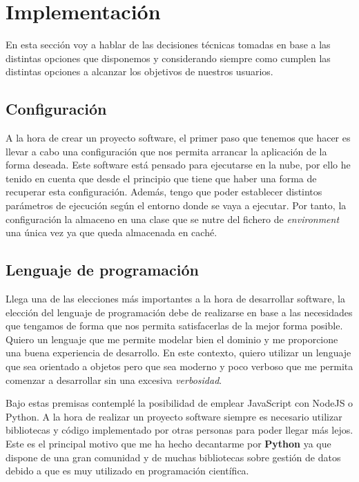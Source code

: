 \section{Implementación}
En esta sección voy a hablar de las decisiones técnicas tomadas en base a las distintas opciones que disponemos y considerando siempre como cumplen las distintas opciones a alcanzar los objetivos de nuestros usuarios.

\subsection{Configuración}
A la hora de crear un proyecto software, el primer paso que tenemos que hacer es llevar a cabo una configuración que nos permita arrancar la aplicación de la forma deseada. Este software está pensado para ejecutarse en la nube, por ello he tenido en cuenta que desde el principio que tiene que haber una forma de recuperar esta configuración. Además, tengo que poder establecer distintos parámetros de ejecución según el entorno donde se vaya a ejecutar. Por tanto, la configuración la almaceno en una clase que se nutre del fichero de \textit{environment} una única vez ya que queda almacenada en caché. 

\subsection{Lenguaje de programación}
Llega una de las elecciones más importantes a la hora de desarrollar software, la elección del lenguaje de programación
debe de realizarse en base a las necesidades que tengamos de forma que nos permita satisfacerlas de la mejor forma posible.
Quiero un lenguaje que me permite modelar bien el dominio y me proporcione una buena experiencia de desarrollo. En este contexto,
quiero utilizar un lenguaje que sea orientado a objetos pero que sea moderno y poco verboso que me permita comenzar a desarrollar
sin una excesiva \textit{verbosidad}.

Bajo estas premisas contemplé la posibilidad de emplear JavaScript con NodeJS o Python. A la hora de realizar un proyecto
software siempre es necesario utilizar bibliotecas y código implementado por otras personas para poder llegar más lejos.
Este es el principal motivo que me ha hecho decantarme por \textbf{Python} ya que dispone de una gran comunidad
y de muchas bibliotecas sobre gestión de datos debido a que es muy utilizado en programación científica.

